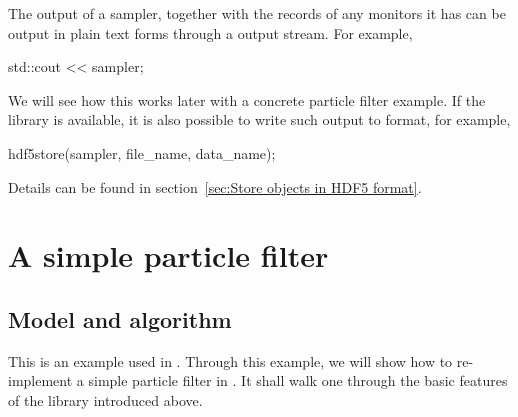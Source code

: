 The output of a sampler, together with the records of any monitors it has can
be output in plain text forms through a \cpp output stream. For example,
\begin{cppcode}
  std::cout << sampler;
\end{cppcode}
We will see how this works later with a concrete particle filter example. If
the \hdf library is available, it is also possible to write such output to \hdf
format, for example,
\begin{cppcode}
  hdf5store(sampler, file_name, data_name);
\end{cppcode}
Details can be found in section~\ref{sec:Store objects in HDF5 format}.

\section{A simple particle filter}
\label{sec:A simple particle filter}

\subsection{Model and algorithm}
\label{sub:Model and algorithm}

This is an example used in \textcite{Johansen:2009wd}. Through this example, we
will show how to re-implement a simple particle filter in \vsmc. It shall walk
one through the basic features of the library introduced above.

